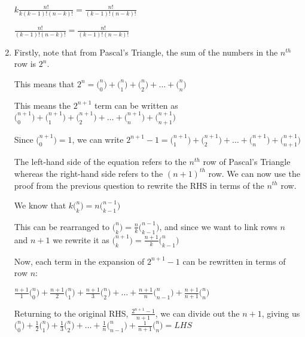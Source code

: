 \documentclass[../main.tex]{subfiles}
\begin{document}
\begin{enumerate}
    \(k\frac{n!}{k(k-1)!(n-k)!}=\frac{n!}{(k-1)!(n-k)!} \)

    \(\frac{n!}{(k-1)!(n-k)!}=\frac{n!}{(k-1)!(n-k)!} \)

    \item 
    Firstly, note that from Pascal's Triangle, the sum of the numbers in the $n^{th}$ row is $2^n$.

    This means that $2^n = \bigl(^n_0\bigr)+\bigl(^n_1\bigr)+\bigl(^n_2\bigr)+\dots+\bigl(^n_n\bigr)$

    This means the $2^{n+1}$ term can be written as $\bigl(^{n+1}_0\bigr)+\bigl(^{n+1}_1\bigr)+\bigl(^{n+1}_2\bigr)+\dots+\bigl(^{n+1}_n\bigr)+\bigl(^{n+1}_{n+1}\bigr)$

    Since $\bigl(^{n+1}_0\bigr)=1$, we can write $2^{n+1}-1=\bigl(^{n+1}_1\bigr)+\bigl(^{n+1}_2\bigr)+\dots+\bigl(^{n+1}_n\bigr)+\bigl(^{n+1}_{n+1}\bigr)$

    The left-hand side of the equation refers to the $n^{th}$ row of Pascal's Triangle whereas the right-hand side refers to the $(n+1)^{th}$ row. We can now use the proof from the previous question to rewrite the RHS in terms of the $n^{th}$ row.

    We know that \(k\bigl(^n_k\bigr)=n\bigl(^{n-1}_{k-1}\bigr) \)

    This can be rearranged to \(\bigl(^n_k\bigr)=\frac{n}{k}\bigl(^{n-1}_{k-1}\bigr) \), and since we want to link rows $n$ and $n+1$ we rewrite it as \(\bigl(^{n+1}_{k}\bigr)=\frac{n+1}{k}\bigl(^{n}_{k-1}\bigr) \)

    Now, each term in the expansion of $2^{n+1}-1$ can be rewritten in terms of row $n$:

    \(\frac{n+1}{1}\bigl(^n_0\bigr)+\frac{n+1}{2}\bigl(^n_1\bigr)+\frac{n+1}{3}\bigl(^n_2\bigr)+\dots+\frac{n+1}{n}\bigl(^n_{n-1}\bigr)+\frac{n+1}{n+1}\bigl(^n_n\bigr)\)

    Returning to the original RHS, \(\frac{2^{n+1}-1}{n+1}\), we can divide out the $n+1$, giving us \(\bigl(^n_0\bigr)+\frac{1}{2}\bigl(^n_1\bigr)+\frac{1}{3}\bigl(^n_2\bigr)+\dots+\frac{1}{n}\bigl(^n_{n-1}\bigr)+\frac{1}{n+1}\bigl(^n_n\bigr)=LHS\)
\end{enumerate}
\end{document}
